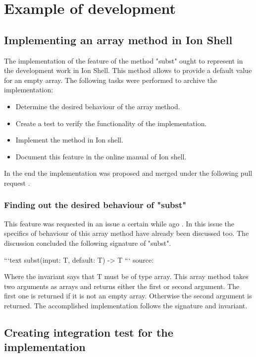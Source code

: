\section{Example of development}

\subsection{Implementing an array method in Ion Shell}

The implementation of the feature of the method "subst" ought to represent in the development work in Ion Shell.
This method allows to provide a default value for an empty array.
The following tasks were performed to archive the implementation:

\begin{itemize}
	\item Determine the desired behaviour of the array method.
	\item Create a test to verify the functionality of the implementation.
	\item Implement the method in Ion shell.
	\item Document this feature in the online manual of Ion shell.
\end{itemize}

In the end the implementation was proposed and merged under the following pull request \cite{pr_subst_method}.

\subsubsection{Finding out the desired behaviour of "subst"}\label{subst_desired_behaviour}

This feature was requested in an issue a certain while ago \cite{ion_shell_subst_issue}.
In this issue the specifics of behaviour of this array method have already been discussed too.
The discussion concluded the following signature of "subst".

```text
subst(input: T, default: T) -> T
```
source: \cite{issue_subst_request}

Where the invariant says that T must be of type array.
This array method takes two arguments as arrays and returns either the first or second argument.
The first one is returned if it is not an empty array. Otherwise the second argument is returned.
The accomplished implementation follows the signature and invariant.

\subsection{Creating integration test for the implementation}\label{subst_test}

